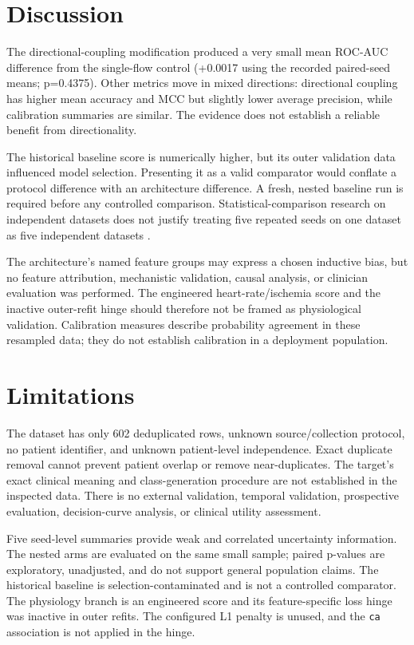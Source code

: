 \documentclass[10pt,twocolumn]{article}
\begin{document}
\section{Discussion}

The directional-coupling modification produced a very small mean ROC-AUC difference from the single-flow control (+0.0017 using the recorded paired-seed means; p=0.4375). Other metrics move in mixed directions: directional coupling has higher mean accuracy and MCC but slightly lower average precision, while calibration summaries are similar. The evidence does not establish a reliable benefit from directionality.

The historical baseline score is numerically higher, but its outer validation data influenced model selection. Presenting it as a valid comparator would conflate a protocol difference with an architecture difference. A fresh, nested baseline run is required before any controlled comparison. Statistical-comparison research on independent datasets does not justify treating five repeated seeds on one dataset as five independent datasets \cite{Demsar2006}.

The architecture's named feature groups may express a chosen inductive bias, but no feature attribution, mechanistic validation, causal analysis, or clinician evaluation was performed. The engineered heart-rate/ischemia score and the inactive outer-refit hinge should therefore not be framed as physiological validation. Calibration measures describe probability agreement in these resampled data; they do not establish calibration in a deployment population.

\section{Limitations}

The dataset has only 602 deduplicated rows, unknown source/collection protocol, no patient identifier, and unknown patient-level independence. Exact duplicate removal cannot prevent patient overlap or remove near-duplicates. The target's exact clinical meaning and class-generation procedure are not established in the inspected data. There is no external validation, temporal validation, prospective evaluation, decision-curve analysis, or clinical utility assessment.

Five seed-level summaries provide weak and correlated uncertainty information. The nested arms are evaluated on the same small sample; paired p-values are exploratory, unadjusted, and do not support general population claims. The historical baseline is selection-contaminated and is not a controlled comparator. The physiology branch is an engineered score and its feature-specific loss hinge was inactive in outer refits. The configured L1 penalty is unused, and the \texttt{ca} association is not applied in the hinge.
\end{document}
